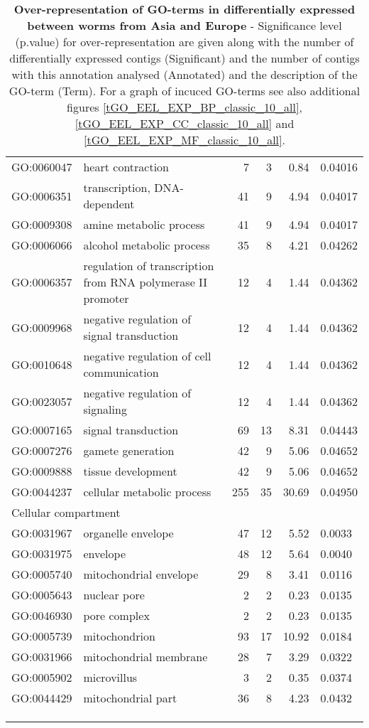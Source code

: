 \begin{longtable}{lp{4.5cm}rrrl}
  GO:0060047 & heart contraction &   7 &   3 & 0.84 & 0.04016 \\ 
  GO:0006351 & transcription, DNA-dependent &  41 &   9 & 4.94 & 0.04017 \\ 
  GO:0009308 & amine metabolic process &  41 &   9 & 4.94 & 0.04017 \\ 
  GO:0006066 & alcohol metabolic process &  35 &   8 & 4.21 & 0.04262 \\ 
  GO:0006357 & regulation of transcription from RNA polymerase II promoter &  12 &   4 & 1.44 & 0.04362 \\ 
  GO:0009968 & negative regulation of signal transduction &  12 &   4 & 1.44 & 0.04362 \\ 
  GO:0010648 & negative regulation of cell communication &  12 &   4 & 1.44 & 0.04362 \\ 
  GO:0023057 & negative regulation of signaling &  12 &   4 & 1.44 & 0.04362 \\ 
  GO:0007165 & signal transduction &  69 &  13 & 8.31 & 0.04443 \\ 
  GO:0007276 & gamete generation &  42 &   9 & 5.06 & 0.04652 \\ 
  GO:0009888 & tissue development &  42 &   9 & 5.06 & 0.04652 \\ 
  GO:0044237 & cellular metabolic process & 255 &  35 & 30.69 & 0.04950 \\ 
   \hline
   \multicolumn{6}{l}{Cellular compartment}  \\ 
GO:0031967 & organelle envelope &  47 &  12 & 5.52 & 0.0033 \\ 
  GO:0031975 & envelope &  48 &  12 & 5.64 & 0.0040 \\ 
  GO:0005740 & mitochondrial envelope &  29 &   8 & 3.41 & 0.0116 \\ 
  GO:0005643 & nuclear pore &   2 &   2 & 0.23 & 0.0135 \\ 
  GO:0046930 & pore complex &   2 &   2 & 0.23 & 0.0135 \\ 
  GO:0005739 & mitochondrion &  93 &  17 & 10.92 & 0.0184 \\ 
  GO:0031966 & mitochondrial membrane &  28 &   7 & 3.29 & 0.0322 \\ 
  GO:0005902 & microvillus &   3 &   2 & 0.35 & 0.0374 \\ 
  GO:0044429 & mitochondrial part &  36 &   8 & 4.23 & 0.0432 \\ 
   \hline\\
   \caption[Over-representation of GO-terms in differentially
   expressed between worms from Asia and Europe
   ]{\textbf{Over-representation of GO-terms in differentially
       expressed between worms from Asia and Europe} - Significance
     level (p.value) for over-representation are given along with the
     number of differentially expressed contigs (Significant) and the
     number of contigs with this annotation analysed (Annotated) and
     the description of the GO-term (Term). For a graph of incuced
     GO-terms see also additional figures
     \ref{tGO_EEL_EXP_BP_classic_10_all},
     \ref{tGO_EEL_EXP_CC_classic_10_all} and
     \ref{tGO_EEL_EXP_MF_classic_10_all}.}\\
   \label{over-de-ae-454}
\end{longtable}

